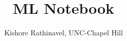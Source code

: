 \documentclass[11pt,letterpaper]{article}
\begin{document}
\setlength{\droptitle}{-4em}
\title{ML Notebook}
\author{Kishore Rathinavel, UNC-Chapel Hill}
\date{\vspace{-1ex}}
\maketitle

\tableofcontents


\printbibliography
\end{document}

